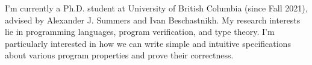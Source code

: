 \documentclass[12pt,letterpaper]{report}
\newcommand{\listitemspace}{0.15em}
\renewenvironment{itemize}
{\begin{list}{}{\setlength{\leftmargin}{0em}
			\setlength{\parskip}{0em}
			\setlength{\itemsep}{\listitemspace}
			\setlength{\parsep}{\listitemspace}}}
	{\end{list}}
\begin{document}
\begin{itemize}



	\item I’m currently a Ph.D. student at University of British Columbia (since Fall 2021), advised by Alexander
	      J. Summers and Ivan Beschastnikh. My research interests lie in programming languages, program
	      verification, and type theory. I’m particularly interested in how we can write simple and intuitive specifications about various program properties and prove their correctness.

\end{itemize}

\end{document}
